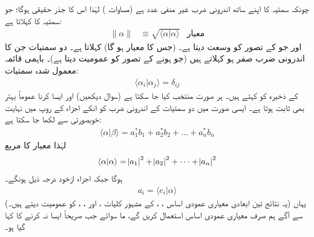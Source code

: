 چونکہ  سمتیہ کا اپنے ساتھ اندرونی ضرب غیر منفی عدد  ہے  (مساوات )  لہٰذا اس کا جذر حقیقی ہوگا؛ جو سمتیہ کا   کہلاتا ہے:
\begin{align}
	\|\alpha\|&\equiv\sqrt{\langle\alpha|\alpha\rangle}&  \text{معیار} 
\end{align}
اور جو   کے تصور کو وسعت دیتا ہے۔   (جس کا معیار   ہو گا)      کہلاتا ہے۔ دو سمتیات جن کا اندرونی ضرب صفر ہو     کہلاتے ہیں  (جو   ہونے کے تصور کو عمومیت دیتا ہے)۔ باہمی قائمہ معمول شدہ سمتیات:
\begin{align}
	\langle\alpha_i|\alpha_j\rangle=\delta_{ij}
\end{align}
کے ذخیرہ کو  کہتے ہیں۔   ہر صورت منتخب کیا جا سکتا ہے (سوال  دیکھیں) اور ایسا کرنا عموماً  بہتر بھی ثابت ہوتا ہے۔ ایسی صورت میں دو سمتیات کے  اندرونی ضرب  کو انکے اجزاء کے روپ  میں نہایت  خوبصورتی سے لکھا جا سکتا ہے:
\begin{align}
	\langle\alpha|\beta\rangle=a_1^*b_1+a_2^*b_2+\dots+a_n^*b_n
\end{align}
لہٰذا    معیار کا مربع
\begin{align}
	\langle\alpha|\alpha\rangle = \abs{a_1}^2+\abs{a_2}^2+\dots+\abs{a_n}^2
\end{align}
ہوگا  جبکہ اجزاء ازخود درجہ ذیل ہونگے۔
\begin{align}
	a_i=\langle e_i|\alpha\rangle
\end{align}
(یہ نتائج تین ابعادی معیاری عمودی اساس ، ،  کے مشہور کلیات
 ،  اور ، ،  کو عمومیت دیتے ہیں۔)  یہاں سے آگے ہم صرف معیاری عمودی اساس استعمال کریں گے،   ما سوائے جب صریحاً ایسا نہ کرنے کا کہا  گیا ہو۔

